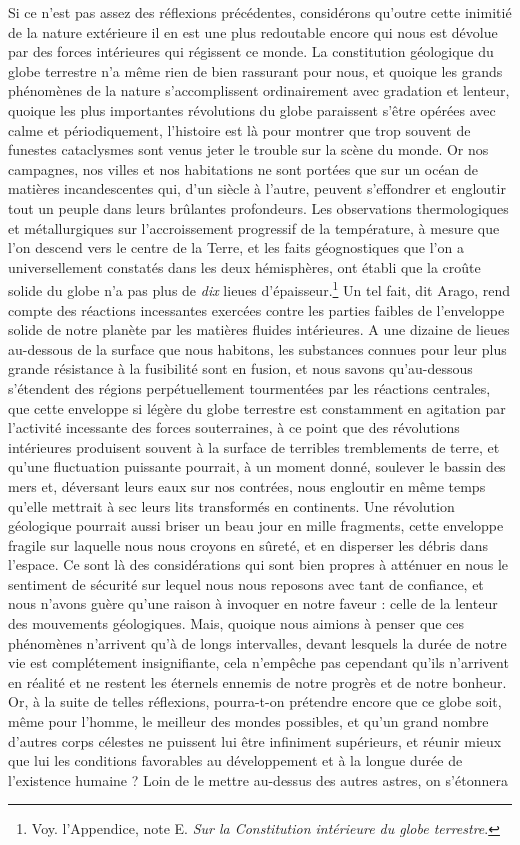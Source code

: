 \documentclass[a4paper, 11pt, oneside]{article}
\begin{document}
Si ce n'est pas assez des réflexions précédentes, considérons qu'outre cette inimitié de la nature extérieure il en est une plus redoutable encore qui nous est dévolue par des forces intérieures qui régissent ce monde. La constitution géologique du globe terrestre n'a même rien de bien rassurant pour nous, et quoique les grands phénomènes de la nature s'accomplissent ordinairement avec gradation et lenteur, quoique les plus importantes révolutions du globe paraissent s'être opérées avec calme et périodiquement, l'histoire est là pour montrer que trop souvent de funestes cataclysmes sont venus jeter le trouble sur la scène du monde. Or nos campagnes, nos villes et nos habitations ne sont portées que sur un océan de matières incandescentes qui, d'un siècle à l'autre, peuvent s'effondrer et engloutir tout un peuple dans leurs brûlantes profondeurs. Les observations thermologiques et métallurgiques sur l'accroissement progressif de la température, à mesure que l'on descend vers le centre de la Terre, et les faits géognostiques que l'on a universellement constatés dans les deux hémisphères, ont établi que la croûte solide du globe n'a pas plus de \emph{dix} lieues d'épaisseur.\footnote{Voy. l'Appendice, note E. \emph{Sur la Constitution intérieure du globe terrestre}.} Un tel fait, dit Arago, rend compte des réactions incessantes exercées contre les parties faibles de l'enveloppe solide de notre planète par les matières fluides intérieures. A une dizaine de lieues au-dessous de la surface que nous habitons, les substances connues pour leur plus grande résistance à la fusibilité sont en fusion, et nous savons qu'au-dessous s'étendent des régions perpétuellement tourmentées par les réactions centrales, que cette enveloppe si légère du globe terrestre est constamment en agitation par l'activité incessante des forces souterraines, à ce point que des révolutions intérieures produisent souvent à la surface de terribles tremblements de terre, et qu'une fluctuation puissante pourrait, à un moment donné, soulever le bassin des mers et, déversant leurs eaux sur nos contrées, nous engloutir en même temps qu'elle mettrait à sec leurs lits transformés en continents. Une révolution géologique pourrait aussi briser un beau jour en mille fragments, cette enveloppe fragile sur laquelle nous nous croyons en sûreté, et en disperser les débris dans l'espace. Ce sont là des considérations qui sont bien propres à atténuer en nous le sentiment de sécurité sur lequel nous nous reposons avec tant de confiance, et nous n'avons guère qu'une raison à invoquer en notre faveur : celle de la lenteur des mouvements géologiques. Mais, quoique nous aimions à penser que ces phénomènes n'arrivent qu'à de longs intervalles, devant lesquels la durée de notre vie est complétement insignifiante, cela n'empêche pas cependant qu'ils n'arrivent en réalité et ne restent les éternels ennemis de notre progrès et de notre bonheur. Or, à la suite de telles réflexions, pourra-t-on prétendre encore que ce globe soit, même pour l'homme, le meilleur des mondes possibles, et qu'un grand nombre d'autres corps célestes ne puissent lui être infiniment supérieurs, et réunir mieux que lui les conditions favorables au développement et à la longue durée de l'existence humaine ? Loin de le mettre au-dessus des autres astres, on s'étonnera 
\end{document}
